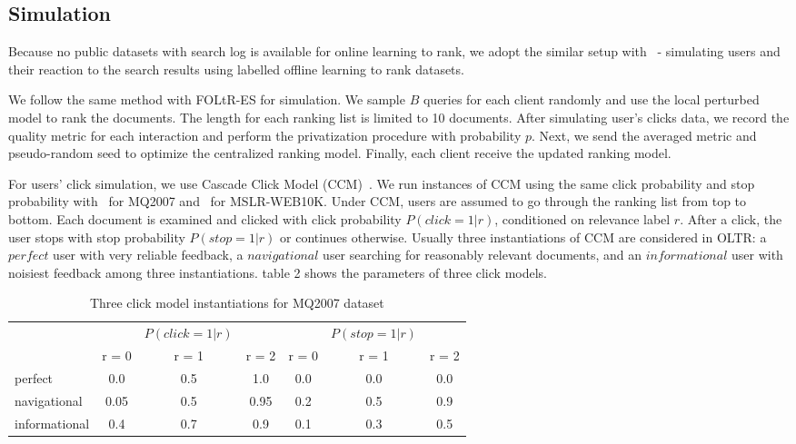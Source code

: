 \subsection{Simulation}

Because no public datasets with search log is available for online learning to rank, we adopt the similar setup with~\cite{DBLP:conf/wsdm/SchuthOWR16, DBLP:conf/wsdm/HofmannSWR13} - simulating users and their reaction to the search results using labelled offline learning to rank datasets.

We follow the same method with FOLtR-ES for simulation. We sample $B$ queries for each client randomly and use the local perturbed model to rank the documents. The length for each ranking list is limited to 10 documents. After simulating user's clicks data, we record the quality metric for each interaction and perform the privatization procedure with probability $p$. Next, we send the averaged metric and pseudo-random seed to optimize the centralized ranking model. Finally, each client receive the updated ranking model. 

For users' click simulation, we use Cascade Click Model (CCM)~\cite{DBLP:conf/wsdm/GuoLW09}. We run instances of CCM using the same click probability and stop probability with~\cite{kharitonov2019federated} for MQ2007 and~\cite{oosterhuis2016probabilistic} for MSLR-WEB10K. Under CCM, users are assumed to go through the ranking list from top to bottom. Each document is examined and clicked with click probability $P(click = 1 | r)$, conditioned on relevance label $r$. After a click, the user stops with stop probability $P(stop = 1 | r)$ or continues otherwise. Usually three instantiations of CCM are considered in OLTR: a $perfect$ user with very reliable feedback, a $navigational$ user searching for reasonably relevant documents, and an $informational$ user with noisiest feedback among three instantiations.  table 2 shows the parameters of three click models.

\begin{table}
	\caption{Three click model instantiations for MQ2007 dataset}
	\label{table:2:mq2007}
	\centering
	\begin{tabular}{l c c c c c c}
		\hline
		&&$P(click = 1 | r)$ &&& $P(stop = 1 | r)$  & \\
		& r = 0&  r = 1  & r = 2 & r = 0&  r = 1  & r = 2\\
		\midrule
		perfect  &   0.0  &    0.5  &    1.0 & 0.0 & 0.0 & 0.0   \\
		navigational  &  0.05  &   0.5  &    0.95  & 0.2 & 0.5 & 0.9  \\
		informational  &   0.4 &   0.7  &    0.9 & 0.1 & 0.3 & 0.5 \\
		\hline
	\end{tabular}
\end{table}

